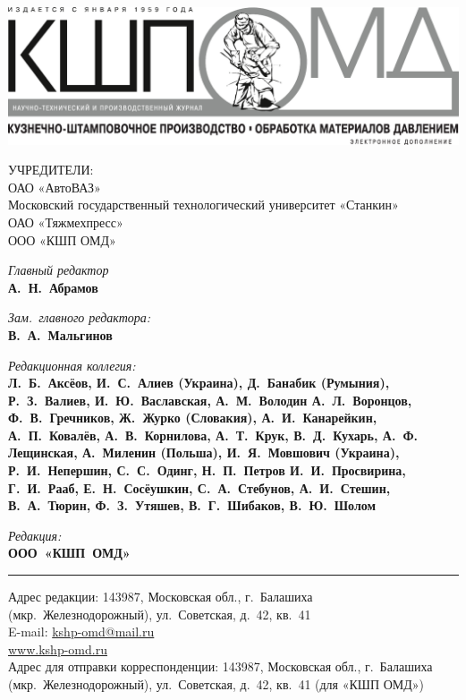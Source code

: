 
\pagestyle{empty}



\vspace{-1cm}
\noindent\includegraphics[width=\textwidth]{kshp-ru-el-logo}

\begin{center}
    \footnotesize
    УЧРЕДИТЕЛИ:\\
ОАО «АвтоВАЗ»\\
Московский государственный технологический университет «Станкин»\\
ОАО «Тяжмехпресс»\\
ООО «КШП ОМД»
\end{center}

\noindent
\begin{minipage}{.7\textwidth}
  \kshpPrintRuCont
\end{minipage}\hspace{0.05\textwidth}%
\begin{minipage}{.25\textwidth}
\begin{flushleft}
    \scriptsize

\textit{Главный редактор}\\
\textbf{А. Н. Абрамов}

\textit{Зам. главного редактора:}\\
\textbf{В. А. Мальгинов}

\textit{Редакционная коллегия:}\\
{\bfseries Л. Б. Аксёов, И. С. Алиев (Украина),
Д. Банабик (Румыния),
Р. З. Валиев, И. Ю. Ваславская, А. М. Володин
А. Л. Воронцов, Ф. В. Гречников,
Ж. Журко (Словакия), А. И. Канарейкин,
А. П. Ковалёв, А. В. Корнилова, А. Т. Крук,
В. Д. Кухарь, А. Ф. Лещинская, А. Миленин
(Польша), И. Я. Мовшович (Украина),
Р. И. Непершин, С. С. Одинг, Н. П. Петров
И. И. Просвирина, Г. И. Рааб, Е. Н. Сосёушкин, С. А. Стебунов, А. И. Стешин,
В. А. Тюрин, Ф. З. Утяшев, В. Г. Шибаков,
В. Ю. Шолом}

\vspace{.3cm}
\textit{Редакция:}\\
\textbf{ООО «КШП ОМД»}

\noindent \rule{\textwidth}{0.6pt}

Адрес редакции: 143987, Московская обл., г. Балашиха (мкр. Железнодорожный), ул. Советская, д. 42, кв. 41\\
E-mail: \href{mailto:kshp-omd@mail.ru}{kshp-omd@mail.ru}\\
\href{https://kshp-omd.ru/}{www.kshp-omd.ru}\\
Адрес для отправки корреспонденции: 143987, Московская обл., г. Балашиха (мкр. Железнодорожный), ул. Советская, д. 42, кв. 41 (для «КШП ОМД»)
\end{flushleft}
\end{minipage}

